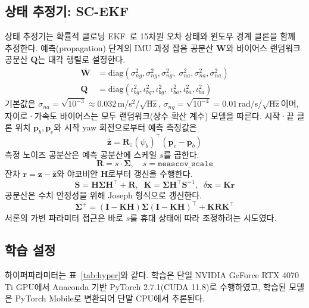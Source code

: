 \documentclass{kcc}
\begin{document}
\subsection{상태 추정기: SC-EKF}
상태 추정기는 확률적 클로닝 EKF~\cite{kalman,stochcloning}로 15차원 오차 상태와 윈도우 경계 클론을 함께 추정한다. 예측(propagation) 단계의 IMU 과정 잡음 공분산 $\mathbf{W}$와 바이어스 랜덤워크 공분산 $\mathbf{Q}$는 대각 행렬로 설정한다.
\begin{align}
\mathbf{W}&=\mathrm{diag}(\sigma_{ng}^2,\sigma_{ng}^2,\sigma_{ng}^2,\;\sigma_{na}^2,\sigma_{na}^2,\sigma_{na}^2)\\
\mathbf{Q}&=\mathrm{diag}(\iota_{bg}^2,\iota_{bg}^2,\iota_{bg}^2,\;\iota_{ba}^2,\iota_{ba}^2,\iota_{ba}^2)
\end{align}
기본값은 $\sigma_{na}=\sqrt{10^{-3}}\approx0.032$\,m/s$^2$/$\sqrt{\text{Hz}}$, $\sigma_{ng}=\sqrt{10^{-4}}=0.01$\,rad/s/$\sqrt{\text{Hz}}$이며, 자이로·가속도 바이어스는 모두 랜덤워크(상수 확산 계수) 모델을 따른다. 시작·끝 클론 위치 $\mathbf{p}_b,\mathbf{p}_e$와 시작 yaw 회전으로부터 예측 측정값은
\begin{equation}
\hat{\mathbf{z}}=\mathbf{R}_z(\psi_b)^{\top}(\mathbf{p}_e-\mathbf{p}_b)
\end{equation}
측정 노이즈 공분산은 예측 공분산에 스케일 $s$를 곱한다.
\begin{equation}
\mathbf{R}=s\cdot\bm{\Sigma},\quad s=\texttt{meascov\_scale}
\end{equation}
잔차 $\mathbf{r}=\mathbf{z}-\hat{\mathbf{z}}$와 야코비안 $\mathbf{H}$로부터 갱신을 수행한다.
\begin{equation}
\mathbf{S}=\mathbf{H}\bm{\Sigma}\mathbf{H}^{\top}+\mathbf{R},\;\;
\mathbf{K}=\bm{\Sigma}\mathbf{H}^{\top}\mathbf{S}^{-1},\;\;
\delta\mathbf{x}=\mathbf{K}\mathbf{r}
\end{equation}
공분산은 수치 안정성을 위해 Joseph 형식으로 갱신한다.
\begin{equation}
\bm{\Sigma}^{+}=(\mathbf{I}-\mathbf{K}\mathbf{H})\bm{\Sigma}(\mathbf{I}-\mathbf{K}\mathbf{H})^{\top}+\mathbf{K}\mathbf{R}\mathbf{K}^{\top}
\end{equation}
서론의 가변 파라미터 접근은 바로 $s$를 휴대 상태에 따라 조정하려는 시도였다.

\subsection{학습 설정}
하이퍼파라미터는 표~\ref{tab:hyper}와 같다. 학습은 단일 NVIDIA GeForce RTX 4070 Ti GPU에서 Anaconda 기반 PyTorch 2.7.1(CUDA 11.8)로 수행하였고, 학습된 모델은 PyTorch Mobile로 변환되어 단말 CPU에서 추론된다.
\end{document}
